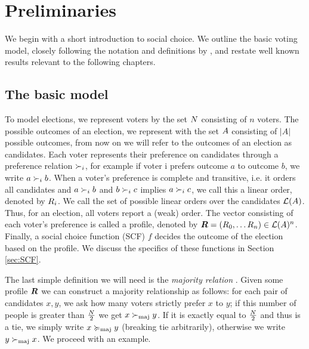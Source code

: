 \chapter{Preliminaries}
\label{chap: preliminaries}

We begin with a short introduction to social choice. We outline
the basic voting model, closely following the notation and definitions by \citet{brandtHandbookComputationalSocial2016}, and restate well known results relevant to the following
chapters.

\section{The basic model}

To model elections, we represent voters by the set $N$ consisting of $n$
voters. The possible outcomes of an election, we represent with the set
$A$ consisting of $|A|$ possible outcomes, from now on we will
refer to the outcomes of an election as candidates. Each voter represents
their preference on candidates through a preference relation $\succ_i$, for
example if voter i prefers outcome $a$ to outcome $b$, we write $a \succ_i b$.
When a voter's preference is complete and transitive, i.e. it orders
all candidates and $a \succ_i b$ and $b \succ_i c$ implies $a \succ_i c$, we
call this a linear order, denoted by $R_i$. We call the set of possible linear orders over the
candidates $\mathcal{L}(A)$. Thus, for an election, all voters report a
(weak) order. The vector consisting of each voter's preference is called a
profile, denoted by $\boldsymbol{R} = (R_0, \dots R_{n}) \in \mathcal{L}(A)^{n}$. Finally, a social choice function (SCF)
$f$ decides the outcome of the election based on the profile. We discuss the
specifics of these functions in Section \cref{sec:SCF}.

The last simple definition we will need is the \emph{majority relation}
\cite{alma990028050780205131}. Given some profile $\boldsymbol{R}$ we can
construct a majority relationship as follows: for each pair of candidates
$x,y$, we ask how many voters strictly prefer $x$ to $y$; if this number of people is
greater than $\frac{N}{2}$ we get $x  \succ_{\textnormal{maj}} y$. If it is exactly equal to
$\frac{N}{2}$ and thus is a tie, we simply write $x \succcurlyeq_{\textnormal{maj}} y$ (breaking tie arbitrarily), otherwise we write $y \succ_{\textnormal{maj}} x$. We proceed with an
example.

